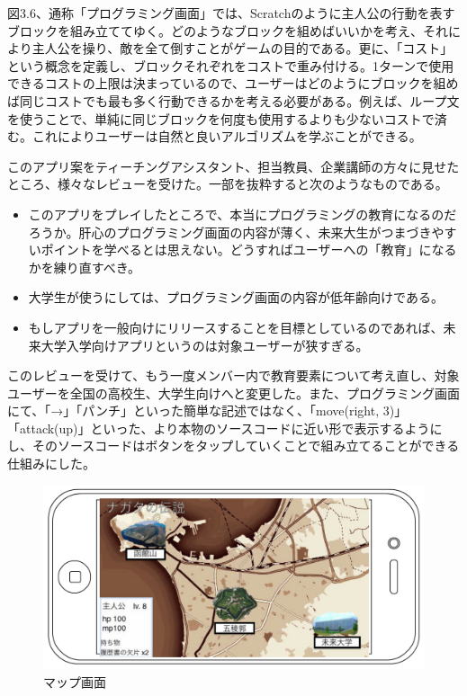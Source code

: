 \documentclass[openany,11pt,papersize]{jsbook}
\begin{document}
\par 図3.6、通称「プログラミング画面」では、Scratchのように主人公の行動を表すブロックを組み立ててゆく。どのようなブロックを組めばいいかを考え、それにより主人公を操り、敵を全て倒すことがゲームの目的である。更に、「コスト」という概念を定義し、ブロックそれぞれをコストで重み付ける。1ターンで使用できるコストの上限は決まっているので、ユーザーはどのようにブロックを組めば同じコストでも最も多く行動できるかを考える必要がある。例えば、ループ文を使うことで、単純に同じブロックを何度も使用するよりも少ないコストで済む。これによりユーザーは自然と良いアルゴリズムを学ぶことができる。
\par このアプリ案をティーチングアシスタント、担当教員、企業講師の方々に見せたところ、様々なレビューを受けた。一部を抜粋すると次のようなものである。
\begin{itemize}
 \item このアプリをプレイしたところで、本当にプログラミングの教育になるのだろうか。肝心のプログラミング画面の内容が薄く、未来大生がつまづきやすいポイントを学べるとは思えない。どうすればユーザーへの「教育」になるかを練り直すべき。
 \item 大学生が使うにしては、プログラミング画面の内容が低年齢向けである。
 \item もしアプリを一般向けにリリースすることを目標としているのであれば、未来大学入学向けアプリというのは対象ユーザーが狭すぎる。
 \end{itemize}
\par このレビューを受けて、もう一度メンバー内で教育要素について考え直し、対象ユーザーを全国の高校生、大学生向けへと変更した。また、プログラミング画面にて、「→」「パンチ」といった簡単な記述ではなく、「move(right, 3)」「attack(up)」といった、より本物のソースコードに近い形で表示するようにし、そのソースコードはボタンをタップしていくことで組み立てることができる仕組みにした。

\begin{figure}[H]
\begin{center}
\includegraphics[width=12cm, bb=0 0 1182 571]{img/LengedOfN_map.png}
\end{center}
\caption{マップ画面}
\end{figure}
\end{document}
